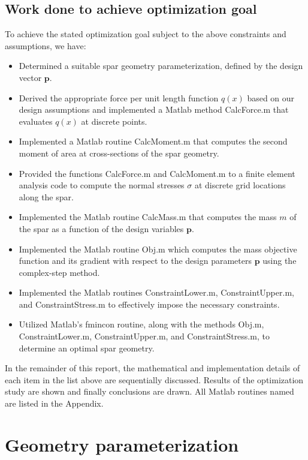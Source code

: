 \documentclass[11pt]{article}
\newcommand{\bs}[1] {\boldsymbol{#1}}
\begin{document}
\subsection{Work done to achieve optimization goal}

To achieve the stated optimization goal subject to the above
constraints and assumptions, we have:
\begin{itemize}
\item Determined a suitable spar geometry parameterization,
defined by the design vector $\bs{p}$.
\item Derived the appropriate force per unit length function
$q(x)$ based on our design assumptions and implemented a Matlab
method CalcForce.m that evaluates $q(x)$ at discrete points.
\item Implemented a Matlab routine CalcMoment.m that computes
the second moment of area at cross-sections of the spar geometry.
\item Provided the functions CalcForce.m and CalcMoment.m to a
finite element analysis code to compute the normal stresses
$\sigma$ at discrete grid locations along the spar.
\item Implemented the Matlab routine CalcMass.m that computes
the mass $m$ of the spar as a function of the design variables
$\bs{p}$.
\item Implemented the Matlab routine Obj.m which computes the
mass objective function and its gradient with respect to the
design parameters $\bs{p}$ using the complex-step method.
\item Implemented the Matlab routines ConstraintLower.m,
ConstraintUpper.m, and ConstraintStress.m to effectively
impose the necessary constraints.
\item Utilized Matlab's fmincon routine, along with the methods
Obj.m, ConstraintLower.m, ConstraintUpper.m, and ConstraintStress.m,
to determine an optimal spar geometry.
\end{itemize}

In the remainder of this report, the mathematical and
implementation details of each item
in the list above are sequentially discussed.
Results of the optimization study are shown and finally
conclusions are drawn. All Matlab routines named are listed
in the Appendix.

\section{Geometry parameterization}
\end{document}
